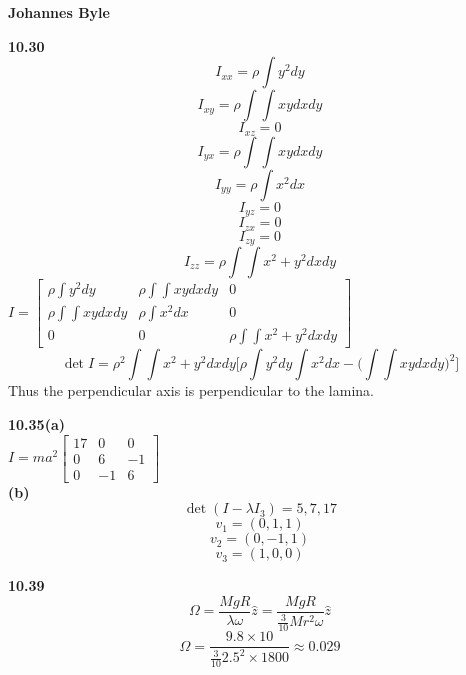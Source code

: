 \documentclass[english]{article}
\begin{document}
\begin{multicols*}{2}
\textbf{Johannes Byle}\\
\newcommand{\Lagr}{\mathcal{L}}

\noindent
\textbf{10.30}
$$I_{xx}=\rho\int y^2dy$$
$$I_{xy}=\rho\int\int xydxdy$$
$$I_{xz}=0$$
$$I_{yx}=\rho\int\int xydxdy$$
$$I_{yy}=\rho\int x^2dx$$
$$I_{yz}=0$$
$$I_{zx}=0$$
$$I_{zy}=0$$
$$I_{zz}=\rho\int\int x^2+y^2dxdy$$
$I=
\begin{bmatrix}
  \rho\int y^2dy & \rho\int\int xydxdy & 0 \\
  \rho\int\int xydxdy & \rho\int x^2dx & 0 \\
  0 & 0 & \rho\int\int x^2+y^2dxdy
 \end{bmatrix}
$
$$\det I= \rho^2\int\int x^2+y^2dxdy\Big[\rho\int y^2dy\int x^2dx-\Big(\int\int xydxdy\Big)^2\Big]$$
Thus the perpendicular axis is perpendicular to the lamina.

\noindent
\textbf{10.35(a)}\\
$I=ma^2
\begin{bmatrix}
  17 & 0 & 0 \\
  0 & 6 & -1 \\
  0 & -1 & 6
 \end{bmatrix}
$\\
\textbf{(b)}\\
$$\det(I-\lambda I_3)=5,7,17$$
$$v_1=(0,1,1)$$
$$v_2=(0,-1,1)$$
$$v_3=(1,0,0)$$

\noindent
\textbf{10.39}\\
$$\Omega=\frac{MgR}{\lambda\omega}\hat{z}=\frac{MgR}{\frac{3}{10}Mr^2\omega}\hat{z}$$
$$\Omega=\frac{9.8\times10}{\frac{3}{10}2.5^2\times1800}\approx0.029$$
\end{multicols*}
\end{document}
